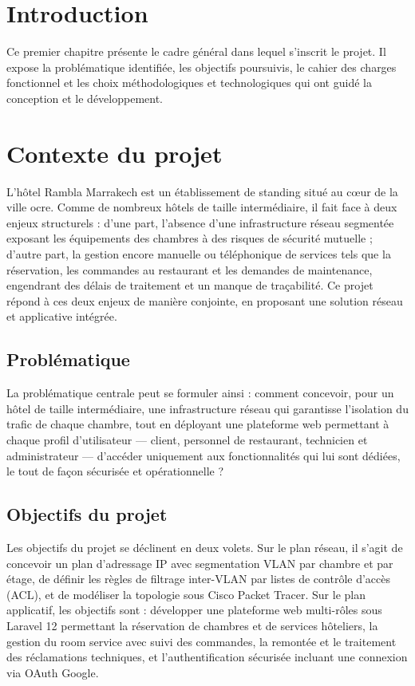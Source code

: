 \documentclass[12pt,a4paper]{report}
\begin{document}
\section{Introduction}

Ce premier chapitre présente le cadre général dans lequel s'inscrit le
projet. Il expose la problématique identifiée, les objectifs poursuivis,
le cahier des charges fonctionnel et les choix méthodologiques et
technologiques qui ont guidé la conception et le développement.

\section{Contexte du projet}

L'hôtel Rambla Marrakech est un établissement de standing situé au c\oe ur
de la ville ocre. Comme de nombreux hôtels de taille intermédiaire, il fait
face à deux enjeux structurels : d'une part, l'absence d'une infrastructure
réseau segmentée exposant les équipements des chambres à des risques de
sécurité mutuelle ; d'autre part, la gestion encore manuelle ou téléphonique
de services tels que la réservation, les commandes au restaurant et les
demandes de maintenance, engendrant des délais de traitement et un manque
de traçabilité. Ce projet répond à ces deux enjeux de manière conjointe, en
proposant une solution réseau et applicative intégrée.

\subsection{Problématique}

La problématique centrale peut se formuler ainsi : comment concevoir, pour
un hôtel de taille intermédiaire, une infrastructure réseau qui garantisse
l'isolation du trafic de chaque chambre, tout en déployant une plateforme
web permettant à chaque profil d'utilisateur --- client, personnel de
restaurant, technicien et administrateur --- d'accéder uniquement aux
fonctionnalités qui lui sont dédiées, le tout de façon sécurisée et
opérationnelle ?

\subsection{Objectifs du projet}

Les objectifs du projet se déclinent en deux volets. Sur le plan réseau,
il s'agit de concevoir un plan d'adressage IP avec segmentation VLAN par
chambre et par étage, de définir les règles de filtrage inter-VLAN par
listes de contrôle d'accès (ACL), et de modéliser la topologie sous Cisco
Packet Tracer. Sur le plan applicatif, les objectifs sont : développer une
plateforme web multi-rôles sous Laravel 12 permettant la réservation de
chambres et de services hôteliers, la gestion du room service avec suivi
des commandes, la remontée et le traitement des réclamations techniques,
et l'authentification sécurisée incluant une connexion via OAuth Google.
\end{document}
